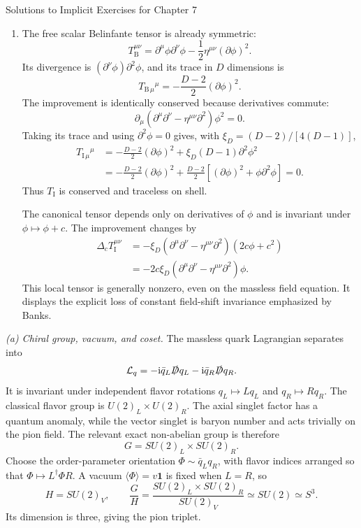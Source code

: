 \begin{bankssolutions}{Solutions to Implicit Exercises for Chapter 7}
\begin{enumerate}[label=(\alph*)]
\item The free scalar Belinfante tensor is already symmetric:
\[
 T_{\mathrm B}^{\mu\nu}
 =\partial^\mu\phi\partial^\nu\phi
 -\frac12\eta^{\mu\nu}(\partial\phi)^2.
\]
Its divergence is $(\partial^\nu\phi)\partial^2\phi$, and its trace in $D$
dimensions is
\[
 T_{\mathrm B\,\mu}{}^\mu=-\frac{D-2}{2}(\partial\phi)^2.
\]
The improvement is identically conserved because derivatives commute:
\[
 \partial_\mu(\partial^\mu\partial^\nu
 -\eta^{\mu\nu}\partial^2)\phi^2=0.
\]
Taking its trace and using $\partial^2\phi=0$ gives, with
$\xi_D=(D-2)/[4(D-1)]$,
\begin{align*}
 T_{\mathrm I\,\mu}{}^\mu
 &=-\frac{D-2}{2}(\partial\phi)^2
 +\xi_D(D-1)\partial^2\phi^2\\
 &=-\frac{D-2}{2}(\partial\phi)^2
 +\frac{D-2}{2}\left[(\partial\phi)^2+\phi\partial^2\phi\right]=0.
\end{align*}
Thus $T_{\mathrm I}$ is conserved and traceless on shell.

The canonical tensor depends only on derivatives of $\phi$ and is invariant
under $\phi\mapsto\phi+c$.  The improvement changes by
\begin{align*}
 \Delta_cT_{\mathrm I}^{\mu\nu}
 &=-\xi_D(\partial^\mu\partial^\nu
 -\eta^{\mu\nu}\partial^2)(2c\phi+c^2)\\
 &=-2c\xi_D(\partial^\mu\partial^\nu
 -\eta^{\mu\nu}\partial^2)\phi.
\end{align*}
This local tensor is generally nonzero, even on the massless field equation.
It displays the explicit loss of constant field-shift invariance emphasized
by Banks.
\end{enumerate}

\textit{(a) Chiral group, vacuum, and coset.}
The massless quark Lagrangian separates into
\[
 \mathcal L_q=-\mathrm{i}\bar q_L\slashed Dq_L
 -\mathrm{i}\bar q_R\slashed Dq_R.
\]
It is invariant under independent flavor rotations
$q_L\mapsto Lq_L$ and $q_R\mapsto Rq_R$.  The classical flavor group is
$U(2)_L\times U(2)_R$.  The axial singlet factor has a quantum anomaly, while
the vector singlet is baryon number and acts trivially on the pion field.
The relevant exact non-abelian group is therefore
\[
 G=SU(2)_L\times SU(2)_R.
\]
Choose the order-parameter orientation
$\Phi\sim\bar q_Lq_R$, with flavor indices arranged so that
$\Phi\mapsto L^\dagger\Phi R$.  A vacuum
$\langle\Phi\rangle=v\mathbf1$ is fixed when $L=R$, so
\[
 H=SU(2)_V,\qquad
 \frac{G}{H}=\frac{SU(2)_L\times SU(2)_R}{SU(2)_V}
 \simeq SU(2)\simeq S^3.
\]
Its dimension is three, giving the pion triplet.


\end{bankssolutions}
